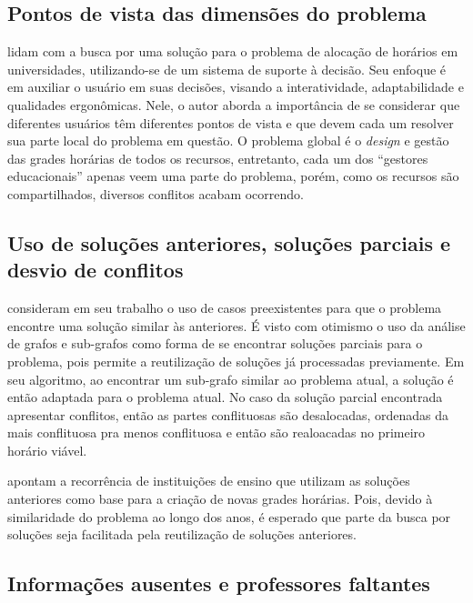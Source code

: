 \subsection{Pontos de vista das dimensões do problema} \label{ssec:pontos}                                %

 lidam com a busca por uma solução para o problema de alocação de horários em universidades, utilizando-se de um sistema de suporte à decisão. Seu enfoque é em auxiliar o usuário em suas decisões, visando a interatividade, adaptabilidade e qualidades ergonômicas. Nele, o autor aborda a importância de se considerar que diferentes usuários têm diferentes pontos de vista e que devem cada um resolver sua parte local do problema em questão. O problema global é o \textit{design} e gestão das grades horárias de todos os recursos, entretanto, cada um dos ``gestores educacionais'' apenas veem uma parte do problema, porém, como os recursos são compartilhados, diversos conflitos acabam ocorrendo.

\subsection{Uso de soluções anteriores, soluções parciais e desvio de conflitos} \label{ssec:parciais}    %

 consideram em seu trabalho o uso de casos preexistentes para que o problema encontre uma solução similar às anteriores. É visto com otimismo o uso da análise de grafos e sub-grafos como forma de se encontrar soluções parciais para o problema, pois permite a reutilização de soluções já processadas previamente. Em seu algoritmo, ao encontrar um sub-grafo similar ao problema atual, a solução é então adaptada para o problema atual. No caso da solução parcial encontrada apresentar conflitos, então as partes conflituosas são desalocadas, ordenadas da mais conflituosa pra menos conflituosa e então são realoacadas no primeiro horário viável.

 apontam a recorrência de instituições de ensino que utilizam as soluções anteriores como base para a criação de novas grades horárias. Pois, devido à similaridade do problema ao longo dos anos, é esperado que parte da busca por soluções seja facilitada pela reutilização de soluções anteriores.

\subsection{Informações ausentes e professores faltantes} \label{ssec:ausentes}                            %

